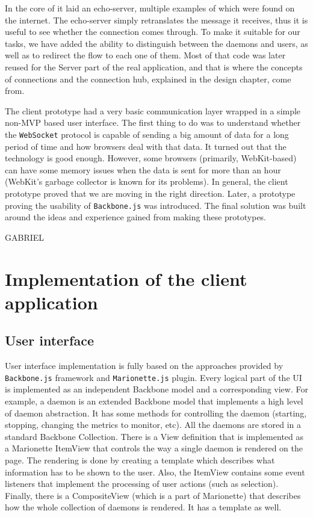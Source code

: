 \documentclass{l3proj}
\begin{document}
In the core of it laid an echo-server, multiple examples of which were found on the internet. The echo-server simply retranslates the message it receives, thus it is useful to see whether the connection comes through. To make it suitable for our tasks, we have added the ability to distinguish between the daemons and users, as well as to redirect the flow to each one of them. Most of that code was later reused for the Server part of the real application, and that is where the concepts of connections and the connection hub, explained in the design chapter, come from.

The client prototype had a very basic communication layer wrapped in a simple non-MVP based user interface. The first thing to do was to understand whether the \texttt{WebSocket} protocol is capable of sending a big amount of data for a long period of time and how browsers deal with that data. It turned out that the technology is good enough. However, some browsers (primarily, WebKit-based) can have some memory issues when the data is sent for more than an hour (WebKit's garbage collector is known for its problems). In general, the client prototype proved that we are moving in the right direction. Later, a prototype proving the usability of \texttt{Backbone.js} was introduced. The final solution was built around the ideas and experience gained from making these prototypes.

GABRIEL


\section{Implementation of the client application}

\subsection{User interface}

User interface implementation is fully based on the approaches provided by \texttt{Backbone.js} framework and \texttt{Marionette.js} plugin. Every logical part of the UI is implemented as an independent Backbone model and a corresponding view. For example, a daemon is an extended Backbone model that implements a high level of daemon abstraction. It has some methods for controlling the daemon (starting, stopping, changing the metrics to monitor, etc). All the daemons are stored in a standard Backbone Collection. There is a View definition that is implemented as a Marionette ItemView that controls the way a single daemon is rendered on the page. The rendering is done by creating a template which describes what information has to be shown to the user. Also, the ItemView contains some event listeners that implement the processing of user actions (such as selection). Finally, there is a CompositeView (which is a part of Marionette) that describes how the whole collection of daemons is rendered. It has a template as well.
\end{document}
